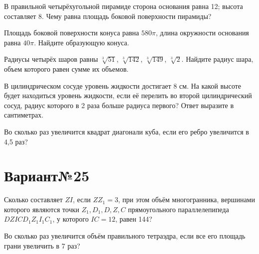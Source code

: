 \documentclass[4apaper]{article}
\begin{document}
\begin{taskBN}{2}
В правильной четырёхугольной пирамиде сторона основания равна 12; высота составляет 8. Чему равна площадь боковой поверхности пирамиды?
\end{taskBN}

\begin{taskBN}{3}
Площадь боковой поверхности конуса равна $580\pi$, длина окружности основания равна $40\pi$. Найдите образующую конуса. 
\end{taskBN}

\begin{taskBN}{4}
Радиусы четырёх шаров равны $\sqrt[3]{51}$, $\sqrt[3]{142}$, $\sqrt[3]{149}$, $\sqrt[3]{2}$. Найдите радиус шара, объем которого равен сумме их объемов.
\end{taskBN}

\begin{taskBN}{5}
В цилиндрическом сосуде уровень жидкости достигает 8 см. На какой высоте будет находиться уровень жидкости, если её перелить во второй цилиндрический сосуд, радиус которого в 2 раза больше радиуса первого? Ответ выразите в сантиметрах.
\end{taskBN}

\begin{taskBN}{6}
Во сколько раз увеличится квадрат диагонали куба, если его ребро увеличится в 4,5 раз?
\end{taskBN}
\newpage\section*{Вариант№25}

\begin{taskBN}{1}
Сколько составляет  $ZI$, если $ZZ_1=3$, при этом объём многогранника, вершинами которого являются точки $Z_1,D_1,D,Z,C$ прямоугольного параллелепипеда $DZICD_1Z_1I_1C_1$, у которого $IC = 12$, равен 144? 
\end{taskBN}

\begin{taskBN}{2}
Во сколько раз увеличится объём правильного тетраэдра, если все его площадь грани увеличить в 7 раз?
\end{taskBN}
\end{document}
